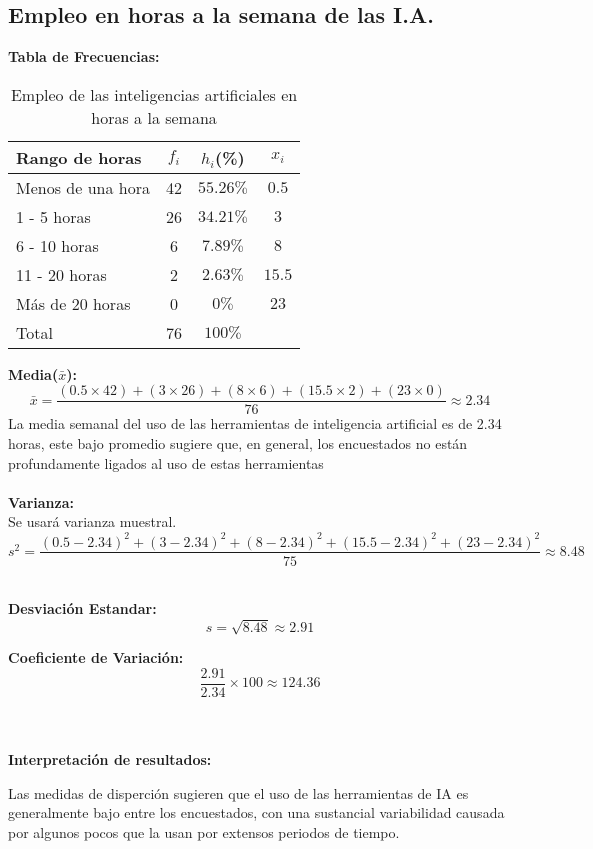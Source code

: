 \subsection{Empleo en horas a la semana de las I.A.}
\textbf{Tabla de Frecuencias:} \\

\begin{table}[h!]
	\centering
	\renewcommand{\arraystretch}{1.5} 
	\begin{tabular}{l c c c }
		\hline
		{Rango de horas} & {\(f_i\)} & \textit{\(h_i\)}(\%) & \textit{\(x_i\)}\\
		\hline
		Menos de una hora	& 42 & \(55.26\%\) & \(0.5\)	\\
		1 - 5 horas			& 26 & \(34.21\%\) & \(3\)		\\
		6 - 10 horas 		& 6  & \(7.89\%\)  & \(8\)		\\
		11 - 20 horas 		& 2  & \(2.63\%\)  & \(15.5\)	\\
		Más de 20 horas		& 0  & \(0\%\)     & \(23\)		\\
		\hline
		Total				& 76 & \(100\%\) \\
		\hline
	\end{tabular}
	\caption{Empleo de las inteligencias artificiales en horas a la semana}
	\label{tabla:EmpleoEnHoras}
\end{table}

\textbf{Media(\(\bar{x}\)):}
\begin{equation*}
	\bar{x} = \frac{(0.5 \times 42) + (3 \times 26) + (8 \times 6) + (15.5 \times 2) + (23 \times 0)}{76} \approx 2.34
\end{equation*}
La media semanal del uso de las herramientas de inteligencia artificial es de 2.34 horas, este bajo promedio sugiere que, en general, los encuestados no están profundamente ligados al uso de estas herramientas \\ \\

\noindent\textbf{Varianza:} \\
Se usará varianza muestral.
\begin{equation*}
	s^2 = \frac{(0.5 - 2.34)^2 + (3 - 2.34)^2 + (8 - 2.34)^2 + (15.5 - 2.34)^2 + (23 - 2.34)^2}{75} \approx 8.48
\end{equation*} \\

\begin{minipage}[t]{0.5\textwidth}
	\noindent\textbf{Desviación Estandar:}
	\begin{equation*}
		s = \sqrt{8.48} \approx 2.91
	\end{equation*}
	
\end{minipage}%
\hfill
\begin{minipage}[t]{0.5\textwidth}
	\noindent\textbf{Coeficiente de Variación:}
	\begin{equation*}
		\frac{2.91}{2.34} \times 100 \approx 124.36
	\end{equation*}  
\end{minipage} \\ \\

\noindent\textbf{Interpretación de resultados:}

Las medidas de disperción sugieren que el uso de las herramientas de IA es generalmente bajo entre los encuestados, con una sustancial variabilidad causada por algunos pocos que la usan por extensos periodos de tiempo.